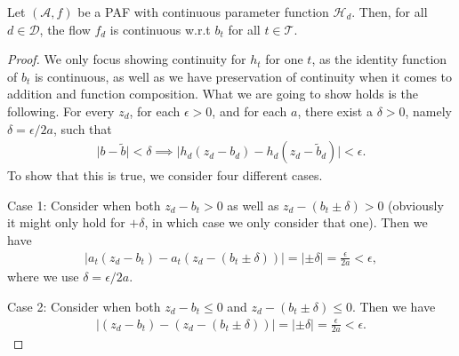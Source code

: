  \begin{lemma}\label{lemma:b_contin}
     Let \((\mathcal{A}, f)\) be a PAF with continuous parameter function \(\mathcal{H}_d\). Then, for all \(d \in \mathcal{D}\), the flow
     \(f_d\) is continuous w.r.t \(b_t\) for all \(t \in \mathcal{T}\).
 \end{lemma}
 \begin{proof}
     We only focus showing continuity for \(h_t\) for one \(t\), as the identity function of \(b_t\) is continuous, as well
     as we have preservation of continuity when it comes to addition and function composition. What we are going to show holds is the following.
     For every \(z_d\), for each \(\epsilon > 0\), and for each \(a\),
     there exist a \(\delta > 0\), namely \(\delta = \epsilon/2a\), such that 
     \begin{align*}
         \lvert b - \tilde b\rvert <\delta \implies \lvert h_d(z_d - b_d) - h_d(z_d - \tilde b_d)\rvert < \epsilon.
     \end{align*}
     To show that this is true, we consider four different cases. 

     Case 1: Consider when both \(z_d - b_t > 0\) as well as \(z_d - (b_t \pm \delta) > 0\) (obviously it might only hold for \(+ \delta\), in which case we
     only consider that one). Then we have
     \begin{align*}
         \lvert a_t(z_d-b_t) - a_t(z_d-(b_t \pm \delta))\rvert = \lvert \pm \delta\rvert = \frac{\epsilon}{2a} < \epsilon,
     \end{align*}
     where we use \(\delta = \epsilon/2a\).

    Case 2: Consider when both \(z_d - b_t \leq 0\) and \(z_d - (b_t \pm \delta) \leq 0\). Then we have
    \begin{align*}
        \lvert (z_d - b_t) - (z_d - (b_t \pm \delta))\rvert = \lvert \pm \delta\rvert = \frac{\epsilon}{2a} < \epsilon.
    \end{align*}


\end{proof}
